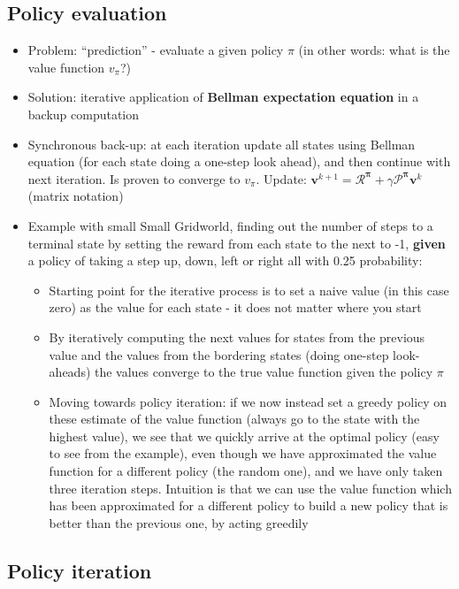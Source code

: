 \documentclass{article}
\begin{document}
\subsection{Policy evaluation}

\begin{itemize}
    \item Problem: ``prediction'' - evaluate a given policy $\pi$ (in other words: what is the value function $v_\pi$?)
    \item Solution: iterative application of \textbf{Bellman expectation equation} in a backup computation
    \item Synchronous back-up: at each iteration update all states using Bellman equation (for each state doing a one-step look ahead), and then continue with next iteration. Is proven to converge to $v_\pi$. Update: $\mathbf{v}^{k+1}=\mathbf{\mathcal{R}^\pi} + \gamma\mathbf{\mathcal{P}^\pi}\mathbf{v}^k$ (matrix notation)
    \item Example with small Small Gridworld, finding out the number of steps to a terminal state by setting the reward from each state to the next to -1, \textbf{given} a policy of taking a step up, down, left or right all with 0.25 probability:
    \begin{itemize}
        \item Starting point for the iterative process is to set a naive value (in this case zero) as the value for each state - it does not matter where you start
        \item By iteratively computing the next values for states from the previous value and the values from the bordering states (doing one-step look-aheads) the values converge to the true value function given the policy $\pi$
        \item Moving towards policy iteration: if we now instead set a greedy policy on these estimate of the value function (always go to the state with the highest value), we see that we quickly arrive at the optimal policy (easy to see from the example), even though we have approximated the value function for a different policy (the random one), and we have only taken three iteration steps. Intuition is that we can use the value function which has been approximated for a different policy to build a new policy that is better than the previous one, by acting greedily
    \end{itemize}
\end{itemize}

\subsection{Policy iteration}
\end{document}
